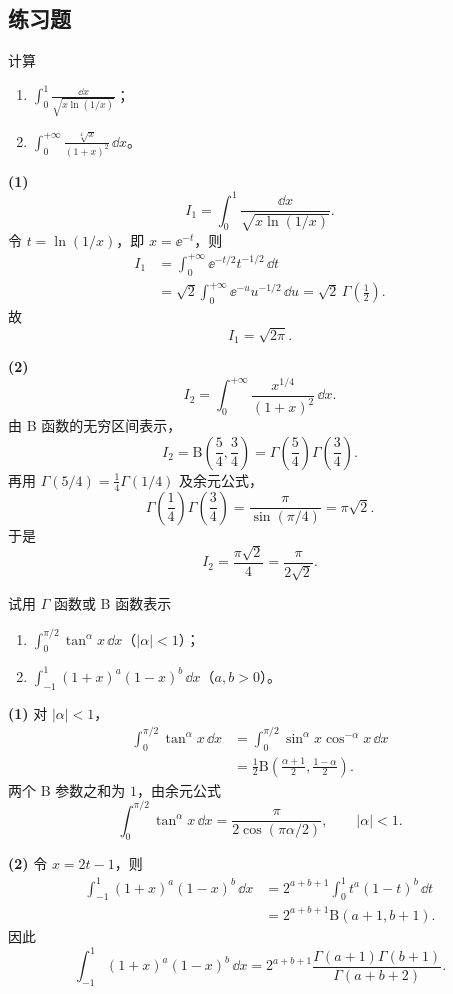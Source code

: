 \subsection{练习题}
\begin{xexercise}[1]
计算
  \begin{enumerate}[label=(\arabic*)]
    \item $\displaystyle\int_0^1\frac{\dd x}{\sqrt{x\ln(1/x)}}$；
    \item $\displaystyle\int_0^{+\infty}\frac{\sqrt[4]{x}}{(1+x)^2}\,\dd x$。
  \end{enumerate}
\end{xexercise}
\begin{xsolution}
\textbf{(1)}
\[
I_1=\int_0^1\frac{\dd x}{\sqrt{x\ln(1/x)}}.
\]
令 $t=\ln(1/x)$，即 $x=\ee^{-t}$，则
\[
\begin{aligned}
I_1
&=\int_0^{+\infty}\ee^{-t/2}t^{-1/2}\,\dd t\\
&=\sqrt2\int_0^{+\infty}\ee^{-u}u^{-1/2}\,\dd u
=\sqrt2\,\Gamma\left(\frac12\right).
\end{aligned}
\]
故
\[
\boxed{I_1=\sqrt{2\pi}}.
\]

\textbf{(2)}
\[
I_2=\int_0^{+\infty}\frac{x^{1/4}}{(1+x)^2}\,\dd x.
\]
由 B 函数的无穷区间表示，
\[
I_2=\mathrm{B}\left(\frac54,\frac34\right)
=\Gamma\left(\frac54\right)\Gamma\left(\frac34\right).
\]
再用 $\Gamma(5/4)=\frac14\Gamma(1/4)$ 及余元公式，
\[
\Gamma\left(\frac14\right)\Gamma\left(\frac34\right)
=\frac\pi{\sin(\pi/4)}=\pi\sqrt2.
\]
于是
\[
\boxed{I_2=\frac{\pi\sqrt2}{4}=\frac\pi{2\sqrt2}}.
\]
\end{xsolution}


\begin{xexercise}[2]
试用 $\Gamma$ 函数或 B 函数表示
  \begin{enumerate}[label=(\arabic*)]
    \item $\displaystyle\int_0^{\pi/2}\tan^\alpha x\,\dd x$（$|\alpha|<1$）；
    \item $\displaystyle\int_{-1}^1(1+x)^a(1-x)^b\,\dd x$（$a,b>0$）。
  \end{enumerate}
\end{xexercise}
\begin{xsolution}
\textbf{(1)} 对 $|\alpha|<1$，
\[
\begin{aligned}
\int_0^{\pi/2}\tan^\alpha x\,\dd x
&=\int_0^{\pi/2}\sin^\alpha x\cos^{-\alpha}x\,\dd x\\
&=\frac12\mathrm{B}\left(\frac{\alpha+1}{2},\frac{1-\alpha}{2}\right).
\end{aligned}
\]
两个 B 参数之和为 $1$，由余元公式
\[
\boxed{
\int_0^{\pi/2}\tan^\alpha x\,\dd x
=\frac\pi{2\cos(\pi\alpha/2)},
\qquad |\alpha|<1.}
\]

\textbf{(2)} 令 $x=2t-1$，则
\[
\begin{aligned}
\int_{-1}^1(1+x)^a(1-x)^b\,\dd x
&=2^{a+b+1}\int_0^1t^a(1-t)^b\,\dd t\\
&=2^{a+b+1}\mathrm{B}(a+1,b+1).
\end{aligned}
\]
因此
\[
\boxed{
\int_{-1}^1(1+x)^a(1-x)^b\,\dd x
=2^{a+b+1}\frac{\Gamma(a+1)\Gamma(b+1)}{\Gamma(a+b+2)}.}
\]
\end{xsolution}


